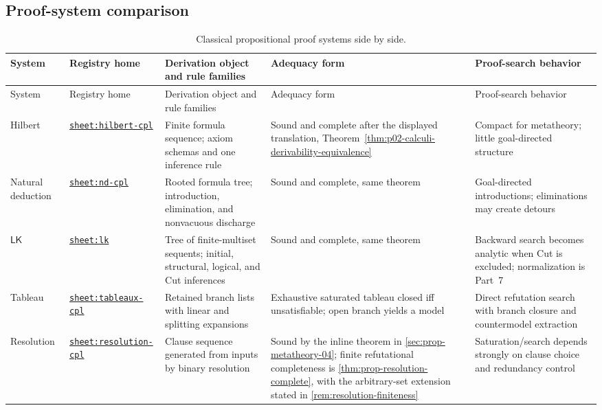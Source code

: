 \begin{landscape}
\section{Proof-system comparison}
\label{sec:p02-proof-system-comparison}

\begingroup\scriptsize\setlength{\tabcolsep}{3pt}
\begin{longtable}{@{}p{.72in}p{1.20in}p{1.80in}p{1.45in}p{1.70in}@{}}
\caption{Classical propositional proof systems side by side.}
\label{tab:p02-proof-systems}\\
\toprule
System & Registry home & Derivation object and rule families & Adequacy form & Proof-search behavior \\ \midrule
\endfirsthead
\toprule
System & Registry home & Derivation object and rule families & Adequacy form & Proof-search behavior \\ \midrule
\endhead
Hilbert & \hyperref[sheet:hilbert-cpl]{\texttt{sheet:hilbert-cpl}} & Finite formula sequence; axiom schemas and one inference rule & Sound and complete after the displayed translation, Theorem~\ref{thm:p02-calculi-derivability-equivalence} & Compact for metatheory; little goal-directed structure \\
Natural deduction & \hyperref[sheet:nd-cpl]{\texttt{sheet:nd-cpl}} & Rooted formula tree; introduction, elimination, and nonvacuous discharge & Sound and complete, same theorem & Goal-directed introductions; eliminations may create detours \\
\(\mathsf{LK}\) & \hyperref[sheet:lk]{\texttt{sheet:lk}} & Tree of finite-multiset sequents; initial, structural, logical, and Cut inferences & Sound and complete, same theorem & Backward search becomes analytic when Cut is excluded; normalization is Part~7 \\
Tableau & \hyperref[sheet:tableaux-cpl]{\texttt{sheet:tableaux-cpl}} & Retained branch lists with linear and splitting expansions & Exhaustive saturated tableau closed iff unsatisfiable; open branch yields a model & Direct refutation search with branch closure and countermodel extraction \\
Resolution & \hyperref[sheet:resolution-cpl]{\texttt{sheet:resolution-cpl}} & Clause sequence generated from inputs by binary resolution & Sound by the inline theorem in \cref{sec:prop-metatheory-04}; finite refutational completeness is \cref{thm:prop-resolution-complete}, with the arbitrary-set extension stated in \cref{rem:resolution-finiteness} & Saturation/search depends strongly on clause choice and redundancy control \\
\bottomrule
\end{longtable}
\endgroup
\end{landscape}
